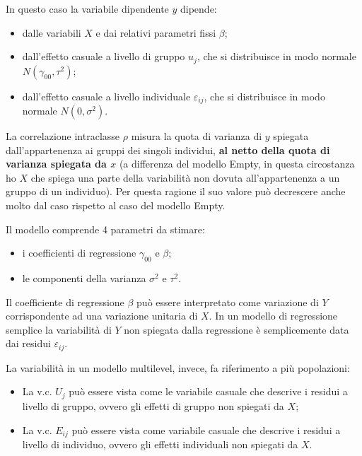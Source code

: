 \documentclass[a4page, 11pt]{article} %
\begin{document}
In questo caso la variabile dipendente $y$ dipende:
\begin{itemize}
\item dalle variabili $X$ e dai relativi parametri fissi $\beta$;
\item dall’effetto casuale a livello di gruppo $u_j$, che si distribuisce in modo normale  $N(\gamma_{00}, \tau^2)$;
\item dall’effetto casuale a livello individuale $\varepsilon_{ij}$, che si distribuisce in modo normale $N(0,\sigma^2)$.
\end{itemize}
La correlazione intraclasse $\rho$ misura la quota di varianza di $y$ spiegata dall’appartenenza ai gruppi dei singoli individui, \textbf{al netto della quota di varianza spiegata da $x$} (a differenza del modello Empty, in questa circostanza ho $X$ che spiega una parte della variabilità non dovuta all’appartenenza a un gruppo di un individuo). Per questa ragione il suo valore può decrescere anche molto dal caso rispetto al caso del modello Empty. 

Il modello comprende 4 parametri da stimare:
\begin{itemize}
\item i coefficienti di regressione $\gamma_{00}$ e $\beta$; \item le componenti della varianza $\sigma^{2}$ e $\tau^{2}$.
\end{itemize}
Il coefficiente di regressione $\beta$ può essere interpretato come variazione di $Y$ corrispondente ad una variazione unitaria di $X$. In un modello di regressione semplice la variabilità di $Y$ non spiegata dalla regressione è semplicemente data dai residui $\varepsilon_{ij}$.

La variabilità in un modello multilevel, invece, fa riferimento a più popolazioni:
\begin{itemize}
\item La v.c. $U_j$ può essere vista come le variabile casuale che descrive i residui a livello di gruppo, ovvero gli effetti di gruppo non spiegati da $X$;
\item La v.c. $E_{ij}$ può essere vista come variabile casuale che descrive i residui a livello di individuo, ovvero gli effetti individuali non spiegati da $X$.
\end{itemize}
\end{document}
